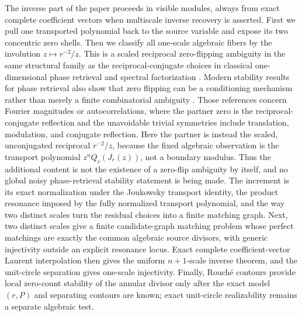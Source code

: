 The inverse part of the paper proceeds in visible modules, always from
exact complete coefficient vectors when multiscale inverse recovery is
asserted.  First we pull one transported polynomial back to the source
variable and expose its two concentric zero shells.  Then we classify
all one-scale algebraic fibers by the involution \(z\mapsto r^{-2}/z\).
This is a scaled reciprocal zero-flipping ambiguity in the same
structural family as the reciprocal-conjugate choices in classical
one-dimensional phase retrieval and spectral factorization
\citep{Akutowicz1956,Walther1963,Hofstetter1964,BruckSodin1979,BeinertPlonka2015,BeinertPlonka2018,Edidin2019,OppenheimSchafer2010}.
Modern stability results for phase retrieval also show that zero
flipping can be a conditioning mechanism rather than merely a finite
combinatorial ambiguity
\citep{GrohsKoppensteinerRathmair2020,JamingKellayPerez2022}.  Those
references concern Fourier magnitudes or autocorrelations, where the
partner zero is the reciprocal-conjugate reflection and the unavoidable
trivial symmetries include translation, modulation, and conjugate
reflection.  Here the partner is instead the scaled, unconjugated
reciprocal \(r^{-2}/z\), because the fixed algebraic observation is the
transport polynomial \(z^nQ_r(J_r(z))\), not a boundary modulus.  Thus
the additional content is not the existence of a zero-flip ambiguity by
itself, and no global noisy phase-retrieval stability statement is being
made.  The increment is its exact normalization under the Joukowsky
transport identity, the product resonance imposed by the fully
normalized transport polynomial, and the way two distinct scales turn
the residual choices into a finite matching graph.
Next, two distinct scales give a finite candidate-graph matching
problem whose perfect matchings are exactly the common algebraic
source divisors, with generic injectivity outside an explicit
resonance locus.  Exact complete coefficient-vector Laurent
interpolation then gives the uniform \(n+1\)-scale inverse theorem,
and the unit-circle separation gives one-scale injectivity.  Finally,
Rouch\'e contours provide local zero-count stability of the annular
divisor only after the exact model \((r,P)\) and separating contours are
known; exact unit-circle realizability remains a separate algebraic test.

